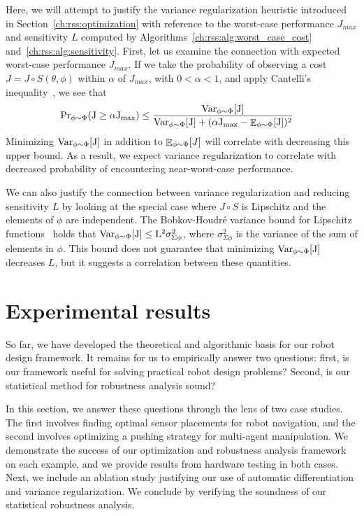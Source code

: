 Here, we will attempt to justify the variance regularization heuristic introduced in Section~\ref{ch:rss:optimization} with reference to the worst-case performance $J_{max}$ and sensitivity $L$ computed by Algorithms~\ref{ch:rss:alg:worst_case_cost} and~\ref{ch:rss:alg:sensitivity}. First, let us examine the connection with expected worst-case performance $J_{max}$. If we take the probability of observing a cost $J = J\circ S(\theta, \phi)$ within $\alpha$ of $J_{max}$, with $0 < \alpha < 1$, and apply Cantelli's inequality~\cite{boucheron_lugosi_massart_2016}, we see that
\begin{align*}
	\rm{Pr}_{\phi \sim \Phi}(J \geq \alpha J_{max}) & \leq \frac{\rm{Var}_{\phi \sim \Phi}[J]}{\rm{Var}_{\phi \sim \Phi}[J] + (\alpha J_{max} - \mathop{\mathbb{E}}_{\phi \sim \Phi}[J])^2}
\end{align*}
Minimizing $\rm{Var}_{\phi \sim \Phi}[J]$ in addition to $\mathop{\mathbb{E}}_{\phi \sim \Phi}[J]$ will correlate with decreasing this upper bound. As a result, we expect variance regularization to correlate with decreased probability of encountering near-worst-case performance.

We can also justify the connection between variance regularization and reducing sensitivity $L$ by looking at the special case where $J \circ S$ is Lipschitz and the elements of $\phi$ are independent. The Bobkov-Houdr\'e variance bound for Lipschitz functions~\cite{bobkov} holds that $\rm{Var}_{\phi \sim \Phi}[J] \leq L^2 \sigma_{\Sigma\phi}^2$,
where $\sigma_{\Sigma\phi}^2$ is the variance of the sum of elements in $\phi$. This bound does not guarantee that minimizing $\rm{Var}_{\phi \sim \Phi}[J]$ decreases $L$, but it suggests a correlation between these quantities.

\section{Experimental results}\label{ch:rss:cases}

So far, we have developed the theoretical and algorithmic basis for our robot design framework. It remains for us to empirically answer two questions: first, is our framework useful for solving practical robot design problems? Second, is our statistical method for robustness analysis sound?

In this section, we answer these questions through the lens of two case studies. The first involves finding optimal sensor placements for robot navigation, and the second involves optimizing a pushing strategy for multi-agent manipulation. We demonstrate the success of our optimization and robustness analysis framework on each example, and we provide results from hardware testing in both cases. Next, we include an ablation study justifying our use of automatic differentiation and variance regularization. We conclude by verifying the soundness of our statistical robustness analysis.

